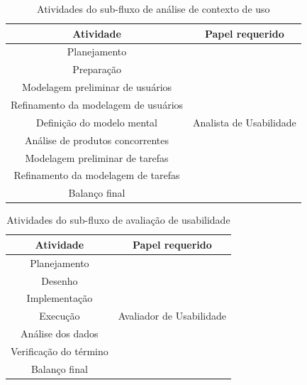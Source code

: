     \begin{table}[h]
        \begin{center}
    		\begin{tabular}{|c|c|}
    			\hline
                \textbf{Atividade} & \textbf{Papel requerido} \\ \hline
    			Planejamento &  \\
                Preparação &  \\
                Modelagem preliminar de  usuários  &  \\
                Refinamento da modelagem de usuários &   \\
                Definição do modelo mental & Analista de Usabilidade  \\
                Análise de produtos concorrentes &  \\
                Modelagem preliminar de tarefas &  \\
                Refinamento da modelagem de tarefas &  \\
                Balanço final &  \\
                \hline
    		\end{tabular}
    		\caption{Atividades do sub-fluxo de análise de contexto de uso}
        	\label{tabAna}
    	\end{center}
    \end{table}

    \begin{table}[h]
        \begin{center}
    		\begin{tabular}{|c|c|}
    			\hline
                \textbf{Atividade} & \textbf{Papel requerido} \\ \hline
    			Planejamento &  \\
                Desenho &  \\
                Implementação &  \\
                Execução & Avaliador de Usabilidade  \\
                Análise dos dados &  \\
                Verificação do término &  \\
                Balanço final &  \\
                \hline
    		\end{tabular}
    		\caption{Atividades do sub-fluxo de avaliação de usabilidade}
        	\label{tabAval}
    	\end{center}
    \end{table}

